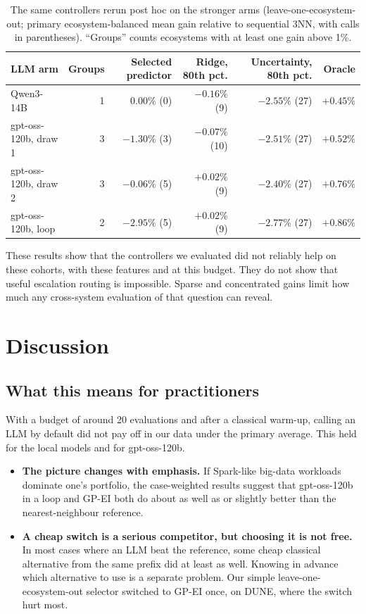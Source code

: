 \begin{table}[t]
\centering
\caption{The same controllers rerun post hoc on the stronger arms (leave-one-ecosystem-out; primary ecosystem-balanced mean gain relative to sequential 3NN, with calls in parentheses). ``Groups'' counts ecosystems with at least one gain above 1\%.}
\label{tab:routers-strong}
\small
\setlength{\tabcolsep}{4pt}
\begin{tabular}{lrrrrr}
\toprule
LLM arm & Groups & Selected predictor & Ridge, 80th pct. & Uncertainty, 80th pct. & Oracle \\
\midrule
Qwen3-14B & 1 & $0.00\%$ (0) & $-0.16\%$ (9) & $-2.55\%$ (27) & $+0.45\%$ \\
gpt-oss-120b, draw 1 & 3 & $-1.30\%$ (3) & $-0.07\%$ (10) & $-2.51\%$ (27) & $+0.52\%$ \\
gpt-oss-120b, draw 2 & 3 & $-0.06\%$ (5) & $+0.02\%$ (9) & $-2.40\%$ (27) & $+0.76\%$ \\
gpt-oss-120b, loop & 2 & $-2.95\%$ (5) & $+0.02\%$ (9) & $-2.77\%$ (27) & $+0.86\%$ \\
\bottomrule
\end{tabular}
\end{table}

These results show that the controllers we evaluated did not reliably help on these cohorts, with these features and at this budget. They do not show that useful escalation routing is impossible. Sparse and concentrated gains limit how much any cross-system evaluation of that question can reveal.

\section{Discussion}

\subsection{What this means for practitioners}

With a budget of around 20 evaluations and after a classical warm-up, calling an LLM by default did not pay off in our data under the primary average. This held for the local models and for gpt-oss-120b.
\begin{itemize}
  \item \textbf{The picture changes with emphasis.} If Spark-like big-data workloads dominate one's portfolio, the case-weighted results suggest that gpt-oss-120b in a loop and GP-EI both do about as well as or slightly better than the nearest-neighbour reference.
  \item \textbf{A cheap switch is a serious competitor, but choosing it is not free.} In most cases where an LLM beat the reference, some cheap classical alternative from the same prefix did at least as well. Knowing in advance which alternative to use is a separate problem. Our simple leave-one-ecosystem-out selector switched to GP-EI once, on DUNE, where the switch hurt most.
\end{itemize}

